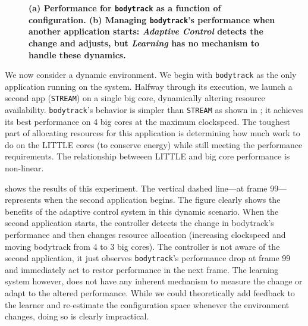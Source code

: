 \begin{figure}
\centering
  \subfloat[]
  {
    
    \label{fig:BODYTRACK_timeline}    
  }
  \caption{\small \bf (a) Performance for \texttt{bodytrack} as a
    function of configuration. (b) Managing \texttt{bodytrack}'s
    performance when another application starts: \emph{Adaptive
      Control} detects the change and adjusts, but \emph{Learning} has
    no mechanism to handle these dynamics. }
  \label{fig:control}
\end{figure}


We now consider a dynamic environment.  We begin with
\texttt{bodytrack} as the only application running on the system.
Halfway through its execution, we launch a second app
(\texttt{STREAM}) on a single big core, dynamically altering resource
availability. \texttt{bodytrack}'s behavior is simpler than
\texttt{STREAM} as shown in ; it
achieves its best performance on 4 big cores at the maximum
clockspeed.  The toughest part of allocating resources for this
application is determining how much work to do on the LITTLE cores (to
conserve energy) while still meeting the performance requirements.
The relationship betweeen LITTLE and big core performance is
non-linear.

 shows the results of this experiment.  The
vertical dashed line---at frame 99---represents when the second
application begins.  The figure clearly shows the benefits of the
adaptive control system in this dynamic scenario.  When the second
application starts, the controller detects the change in bodytrack's
performance and then changes resource allocation (increasing
clockspeed and moving bodytrack from 4 to 3 big cores).  The
controller is not aware of the second application, it just observes
\texttt{bodytrack}'s performance drop at frame 99 and immediately act
to restor performance in the next frame. The learning system however,
does not have any inherent mechanism to measure the change or adapt to
the altered performance.  While we could theoretically add feedback to
the learner and re-estimate the configuration space whenever the
environment changes, doing so is clearly impractical.

